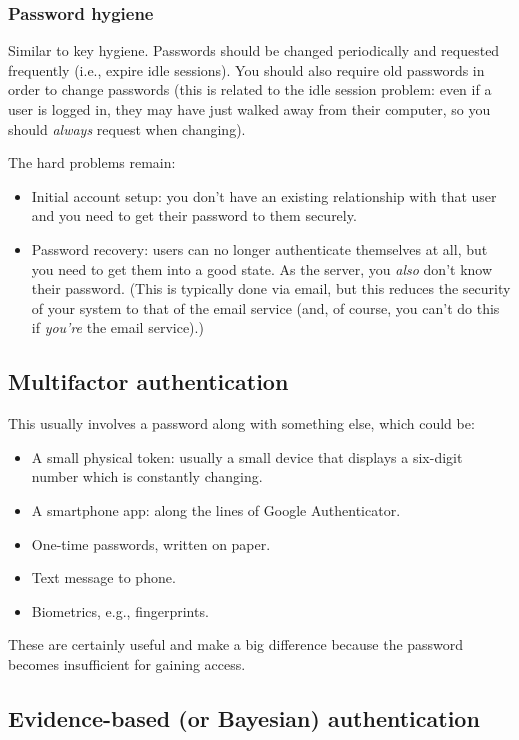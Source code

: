 \documentclass[12pt]{article}
\begin{document}
\subsubsection*{Password hygiene}

Similar to key hygiene. Passwords should be changed periodically and requested frequently (i.e., expire idle sessions). You should also require old passwords in order to change passwords (this is related to the idle session problem: even if a user is logged in, they may have just walked away from their computer, so you should \textit{always} request when changing).

The hard problems remain:
\begin{itemize}
\item Initial account setup: you don't have an existing relationship with that user and you need to get their password to them securely.
\item Password recovery: users can no longer authenticate themselves at all, but you need to get them into a good state. As the server, you \textit{also} don't know their password. (This is typically done via email, but this reduces the security of your system to that of the email service (and, of course, you can't do this if \textit{you're} the email service).)
\end{itemize}

\subsection*{Multifactor authentication}

This usually involves a password along with something else, which could be:
\begin{itemize}
\item A small physical token: usually a small device that displays a six-digit number which is constantly changing.
\item A smartphone app: along the lines of Google Authenticator.
\item One-time passwords, written on paper.
\item Text message to phone.
\item Biometrics, e.g., fingerprints.
\end{itemize}

These are certainly useful and make a big difference because the password becomes insufficient for gaining access.

\subsection*{Evidence-based (or Bayesian) authentication}
\end{document}
